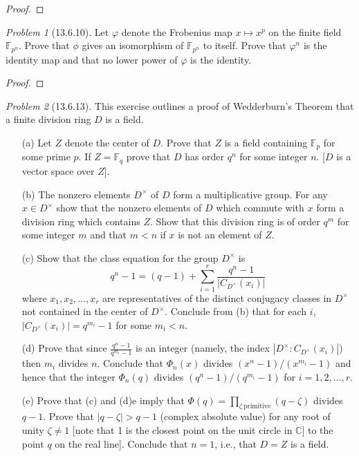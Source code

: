 \documentclass[10pt]{article}
\newcommand{\sk}{\vskip 10mm}
\newcommand{\bb}[1]{\mathbb{#1}}
\theoremstyle{remark}
\newtheorem{problem}{Problem}
\theoremstyle{remark}
\begin{document}
\begin{proof}
  
\end{proof}

\sk

\begin{problem}[13.6.10]
  Let $\varphi$ denote the Frobenius map $x\mapsto x^p$ on the finite field
  $\bb{F}_{p^n}$. Prove that $\phi$ gives an isomorphism of $\bb{F}_{p^n}$
  to itself. Prove that $\varphi^n$ is the identity map and that no
  lower power of $\varphi$ is the identity.
\end{problem}

\begin{proof}
  
\end{proof}

\sk

\begin{problem}[13.6.13]
  This exercise outlines a proof of Wedderburn's Theorem that a
  finite division ring $D$ is a field.
  \begin{enumerate}
  \item[(a)] Let $Z$ denote the center of $D$. Prove that $Z$ is
    a field containing $\bb{F}_p$ for some prime $p$. If $Z=\bb{F}_q$
    prove that $D$ has order $q^n$ for some integer $n$.
    [$D$ is a vector space over $Z$].
    
  \item[(b)] The nonzero elements $D^\times$ of $D$ form a multiplicative group.
    For any $x\in D^\times$ show that the nonzero elements of $D$ which commute
    with $x$ form a division ring which contains $Z$. Show that this
    division ring is of order $q^m$ for some integer $m$ and that $m<n$
    if $x$ is not an element of $Z$.
    
  \item[(c)] Show that the class equation for the group $D^\times$ is
    \[
      q^n-1=(q-1)+\sum_{i=1}^r\frac{q^n-1}{|C_{D^\times}(x_i)|}
    \]
    where $x_1,x_2,\ldots,x_r$ are representatives of the distinct
    conjugacy classes in $D^\times$ not contained in the center of $D^\times$.
    Conclude from (b) that for each $i$, $|C_{D^\times}(x_i)|=q^{m_i}-1$
    for some $m_i<n$.
    
  \item[(d)] Prove that since $\frac{q^n-1}{q^{m_i}-1}$ is an integer
    (namely, the index $|D^\times:C_{D^\times}(x_i)|$) then $m_i$ divides $n$.
    Conclude that $\Phi_n(x)$ divides $(x^n-1)/(x^{m_i}-1)$ and hence that the
    integer $\Phi_n(q)$ divides $(q^n-1)/(q^{m_i}-1)$ for $i=1,2,\ldots,r$.
    
  \item[(e)] Prove that (c) and (d)e imply that
    $\Phi(q)=\prod_{\zeta\ \mathrm{primitive}}(q-\zeta)$ divides $q-1$.
    Prove that $|q-\zeta|>q-1$ (complex absolute value) for any root
    of unity $\zeta\neq 1$ [note that 1 is the closest point on the unit circle
    in $\bb{C}$] to the point $q$ on the real line]. Conclude that
    $n=1$, i.e., that $D=Z$ is a field.
  \end{enumerate}
\end{problem}
\end{document}

